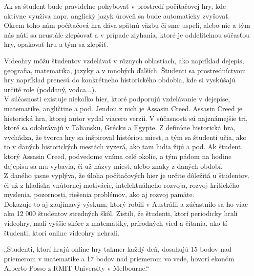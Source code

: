 \documentclass[10pt,slovak,a4paper]{article}
\begin{document}
 \indent Ak sa študent bude pravidelne pohybovať v prostredí počítačovej hry, kde aktívne využíva napr. anglický jazyk úroveň sa bude automaticky zvyšovať. Okrem toho nám počítačová hra dáva spätnú väzbu či sme uspeli, alebo nie a tým nás núti sa neustále zlepšovať a v prípade zlyhania, ktoré je oddeliteľnou súčasťou hry, opakovať hru a tým sa zlepšiť.
 \cite{cite14}

 
 \indent Videohry môžu študentov vzdelávať v rôznych oblastiach, ako napríklad dejepis, geografia, matematika, jazyky a v mnohých ďalších. Študenti sa prostredníctvom hry napríklad prenesú do konkrétneho historického obdobia, kde si vyskúšajú určité role (poddaný, vodca...).\\
\indent V súčasnosti existuje niekoľko hier, ktoré podporujú vzdelávanie v dejepise, matematike, angličtine a pod. Jendou z nich je Assasin Creed. Assasin Creed  je historická hra, ktorej autor vydal viacero verzií. V súčasnosti sú najznámejšie tri, ktoré sa odohrávajú v Taliansku, Grécku a Egypte. Z definície historická hra, vychádza, že tvorca hry sa inšpiroval históriou miest, a tým sa študenti učia, ako to v daných historických mestách vyzerá, ako tam ľudia žijú a pod. Ak študent, ktorý Assasin Creed, podvedome vníma celé okolie, a tým pádom na hodine dejepisu sa mu vybavia, či už názvy miest, alebo znaky z daných období. \\
\indent Z daného jasne vyplýva, že úloha počítačových hier je určite dôležitá u študentov, či už z hľadiska vnútornej motivácie, intelektuálneho rozvoja, rozvoj kritického myslenia, pozornosti, riešenia problémov, ako aj rozvoj pamäte.\\
\indent Dokazuje to aj zaujímavý výskum, ktorý robili v Austrálii a zúčastnilo sa ho viac ako 12 000 študentov stredných škôl. Zistili, že študenti, ktorí periodicky hrali videohry, mali vyššie skóre z matematiky, prírodných vied a čítania, ako tí študenti, ktorí online videohry nehrali.
\cite{cite7}


\indent „Študenti, ktorí hrajú online hry takmer každý deň, dosahujú 15 bodov nad priemerom v matematike a 17 bodov nad priemerom vo vede, hovorí ekonóm Alberto Posso z RMIT University v Melbourne.“
\cite{cite7}
\end{document}
